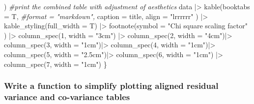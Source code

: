 \documentclass[
]{article}
\newenvironment{Shaded}{\begin{snugshade}}{\end{snugshade}}
\newcommand{\AttributeTok}[1]{\textcolor[rgb]{0.77,0.63,0.00}{#1}}
\newcommand{\CommentTok}[1]{\textcolor[rgb]{0.56,0.35,0.01}{\textit{#1}}}
\newcommand{\DecValTok}[1]{\textcolor[rgb]{0.00,0.00,0.81}{#1}}
\newcommand{\FunctionTok}[1]{\textcolor[rgb]{0.00,0.00,0.00}{#1}}
\newcommand{\NormalTok}[1]{#1}
\newcommand{\SpecialCharTok}[1]{\textcolor[rgb]{0.00,0.00,0.00}{#1}}
\newcommand{\StringTok}[1]{\textcolor[rgb]{0.31,0.60,0.02}{#1}}
\begin{document}
\begin{Shaded}
\begin{Highlighting}[]
\NormalTok{    ) }
\CommentTok{\#print the combined table with adjustment of aesthetics}
\NormalTok{data }\SpecialCharTok{|\textgreater{}} 
  \FunctionTok{kable}\NormalTok{(}\AttributeTok{booktabs =}\NormalTok{ T, }
        \CommentTok{\#format = "markdown", }
        \AttributeTok{caption =} 
\NormalTok{          title,}
        \AttributeTok{align =} \StringTok{"lrrrrrr"}
\NormalTok{        ) }\SpecialCharTok{|\textgreater{}} 
  \FunctionTok{kable\_styling}\NormalTok{(}\AttributeTok{full\_width =}\NormalTok{ T) }\SpecialCharTok{|\textgreater{}} 
  \FunctionTok{footnote}\NormalTok{(}\AttributeTok{symbol =} 
             \StringTok{"Chi square scaling factor"}
\NormalTok{           ) }\SpecialCharTok{|\textgreater{}}
  \FunctionTok{column\_spec}\NormalTok{(}\DecValTok{1}\NormalTok{, }\AttributeTok{width =} \StringTok{"3cm"}\NormalTok{) }\SpecialCharTok{|\textgreater{}} 
  \FunctionTok{column\_spec}\NormalTok{(}\DecValTok{2}\NormalTok{, }\AttributeTok{width =} \StringTok{"4cm"}\NormalTok{)}\SpecialCharTok{|\textgreater{}} 
  \FunctionTok{column\_spec}\NormalTok{(}\DecValTok{3}\NormalTok{, }\AttributeTok{width =} \StringTok{"1cm"}\NormalTok{)}\SpecialCharTok{|\textgreater{}} 
  \FunctionTok{column\_spec}\NormalTok{(}\DecValTok{4}\NormalTok{, }\AttributeTok{width =} \StringTok{"1cm"}\NormalTok{)}\SpecialCharTok{|\textgreater{}} 
  \FunctionTok{column\_spec}\NormalTok{(}\DecValTok{5}\NormalTok{, }\AttributeTok{width =} \StringTok{"2.5cm"}\NormalTok{)}\SpecialCharTok{|\textgreater{}} 
  \FunctionTok{column\_spec}\NormalTok{(}\DecValTok{6}\NormalTok{, }\AttributeTok{width =} \StringTok{"1cm"}\NormalTok{) }\SpecialCharTok{|\textgreater{}} 
  \FunctionTok{column\_spec}\NormalTok{(}\DecValTok{7}\NormalTok{, }\AttributeTok{width =} \StringTok{"1cm"}\NormalTok{) }
\NormalTok{\}}
\end{Highlighting}
\end{Shaded}

\hypertarget{write-a-function-to-simplify-plotting-aligned-residual-variance-and-co-variance-tables}{%
\subsubsection{Write a function to simplify plotting aligned residual variance and co-variance tables}\label{write-a-function-to-simplify-plotting-aligned-residual-variance-and-co-variance-tables}}
\end{document}
